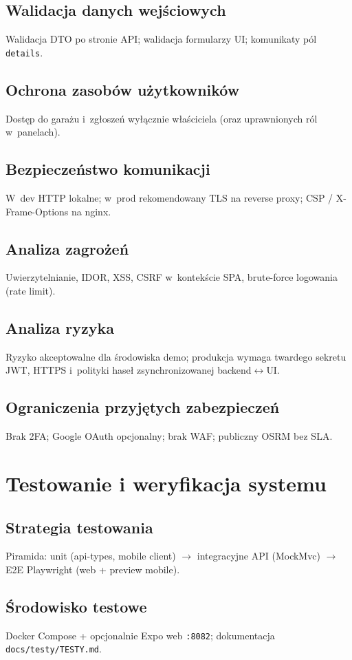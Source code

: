 \documentclass{sprz}
\begin{document}
\section{Walidacja danych wejściowych}
Walidacja DTO po stronie API; walidacja formularzy UI; komunikaty pól \texttt{details}.
\section{Ochrona zasobów użytkowników}
Dostęp do garażu i~zgłoszeń wyłącznie właściciela (oraz uprawnionych ról w~panelach).
\section{Bezpieczeństwo komunikacji}
W~dev HTTP lokalne; w~prod rekomendowany TLS na reverse proxy; CSP / X-Frame-Options na nginx.
\section{Analiza zagrożeń}
Uwierzytelnianie, IDOR, XSS, CSRF w~kontekście SPA, brute-force logowania (rate limit).
\section{Analiza ryzyka}
Ryzyko akceptowalne dla środowiska demo; produkcja wymaga twardego sekretu JWT, HTTPS i~polityki haseł zsynchronizowanej backend$\leftrightarrow$UI.
\section{Ograniczenia przyjętych zabezpieczeń}
Brak 2FA; Google OAuth opcjonalny; brak WAF; publiczny OSRM bez SLA.

\chapter{Testowanie i weryfikacja systemu}
\section{Strategia testowania}
Piramida: unit (api-types, mobile client) $\rightarrow$ integracyjne API (MockMvc) $\rightarrow$ E2E Playwright (web + preview mobile).
\section{Środowisko testowe}
Docker Compose + opcjonalnie Expo web \texttt{:8082}; dokumentacja \texttt{docs/testy/TESTY.md}.
\end{document}

